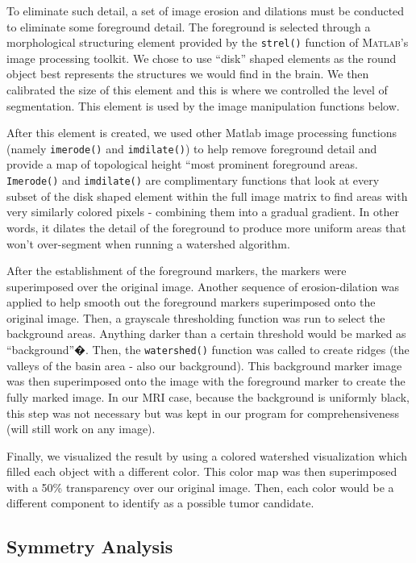 \documentclass[12pt]{article}
\theoremstyle{plain}%
\theoremstyle{definition}
\theoremstyle{remark}
\begin{document}
To eliminate such detail, a set of image erosion and dilations must be conducted to eliminate some foreground detail.  The foreground is selected through a morphological structuring element provided by the \verb|strel()| function of \textsc{Matlab}'s image processing toolkit.  We chose to use ``disk'' shaped elements as the round object best represents the structures we would find in the brain.  We then calibrated the size of this element and this is where we controlled the level of segmentation.  This element is used by the image manipulation functions below.

After this element is created, we used other Matlab image processing functions (namely \verb|imerode()| and \verb|imdilate()|) to help remove foreground detail and provide a map of topological height “most prominent foreground areas. \verb|Imerode()| and \verb|imdilate()| are complimentary functions that look at every subset of the disk shaped element within the full image matrix to find areas with very similarly colored pixels - combining them into a gradual gradient.  In other words, it dilates the detail of the foreground to produce more uniform areas that won't over-segment when running a watershed algorithm. 

After the establishment of the foreground markers, the markers were superimposed over the original image.  Another sequence of erosion-dilation was applied to help smooth out the foreground markers superimposed onto the original image.  Then, a grayscale thresholding function was run to select the background areas.  Anything darker than a certain threshold would be marked as ``background''�. Then, the \verb|watershed()| function was called to create ridges (the valleys of the basin area - also our background).  This background marker image was then superimposed onto the image with the foreground marker to create the fully marked image.  In our MRI case, because the background is uniformly black, this step was not necessary but was kept in our program for comprehensiveness (will still work on any image).

Finally, we visualized the result by using a colored watershed visualization which filled each object with a different color.  This color map was then superimposed with a 50\% transparency over our original image.  Then, each color would be a different component to identify as a possible tumor candidate.
	
\subsection{Symmetry Analysis}
\end{document}
